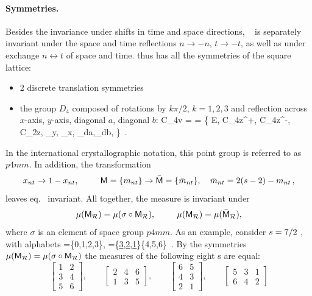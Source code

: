 \documentclass[12pt]{iopart}
\begin{document}
\paragraph{Symmetries.}
Besides the invariance under shifts in time and space directions, \catlatt\
 is separately invariant under the space and time
reflections $n\to -n$, $t\to -t$, as well as under exchange
$n\longleftrightarrow t$ of space and time.
{\catLatt} thus has all the symmetries of the square lattice:
\begin{itemize}
  \item 2 discrete translation symmetries
  \item
the  group $D_4$ composed of  rotations by $k\pi/2$, $k=1,2,3$ and
reflection across $x$-axis, $y$-axis, diagonal $a$, diagonal $b$:
\beq
C_{4v} =  = \{
E, C_{4z}^+, C_{4z}^-, C_{2z},
\sigma_{y}, \sigma_{x},
\sigma_{da},\sigma_{db},
\}
\,.
\end{itemize}
In the international crystallographic notation, this
point group  is referred to as $p4mm$.
In addition,  the transformation
\[
x_{nt}\to 1-x_{nt},
  \qquad
\Mm=\{\Ssym{nt}\}\to \bar{\Mm}=\{\bar{m}_{nt} \}, \quad \bar{m}_{nt}
   = \edit{2(s-2)}-\Ssym{nt}
\,,
\]
leaves eq.~ invariant. All together, the measure is
invariant under
\[
 {\mu}({\mathsf{M}_{\mathcal{R}}})={\mu}(\sigma\circ{\ensuremath{\mathsf{M}}_{\ensuremath{\mathcal{R}}}}), \hspace*{25pt}  {\mu}({\mathsf{M}_{\mathcal{R}}})={\mu}(\bar{\mathsf{M}}_{\mathcal{R}}),
\]
where $\sigma$ is an element of space group $p4mm$.
As an  example,
consider $s=7/2$ \catlatt, with alphabets 
\beq
  \Ai=\{0,1,2,3\},   \quad
  \Ae=\{\underline{3},\underline{2},\underline{1}\}\cup \{4,5,6\}
\,.
By the  symmetries $\Msr(\MmR)=\Msr(\sigma\circ\MmR)$ the measures of
the following eight {\brick s} are equal:
    \[
        \left[\begin{array}{cc}
 1  & 2 \\
 3 & 4\\
 5 & 6
              \end{array}\right], \qquad  \left[\begin{array}{ccc}
 2  & 4 & 6 \\
 1 & 3 & 5
              \end{array}\right], \qquad  \left[\begin{array}{cc}
 6  & 5 \\
 4 & 3\\
 2 & 1
              \end{array}\right],\qquad
      \left[\begin{array}{ccc}
 5  & 3 & 1 \\
 6 & 4 & 2
              \end{array}\right]
              \]
\end{document}
